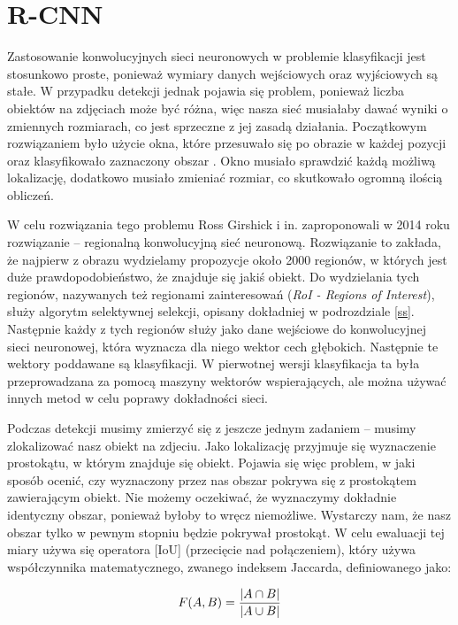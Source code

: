 \documentclass[a4paper,twoside,12pt]{book}
\newcommand{\obcy}[1]{\emph{#1}}
\newcommand{\ang}[1]{{\selectlanguage{british}\obcy{#1}}}
\begin{document}
{\section{R-CNN}
{Zastosowanie konwolucyjnych sieci neuronowych w problemie klasyfikacji jest stosunkowo proste, ponieważ wymiary danych wejściowych oraz wyjściowych są stałe. W przypadku detekcji jednak pojawia się problem, ponieważ liczba obiektów na zdjęciach może być różna, więc nasza sieć musiałaby dawać wyniki o zmiennych rozmiarach, co jest sprzeczne z jej zasadą działania. Początkowym rozwiązaniem było użycie okna, które przesuwało się po obrazie w każdej pozycji oraz klasyfikowało zaznaczony obszar \cite{szegedy2013deep}. Okno musiało sprawdzić każdą możliwą lokalizację, dodatkowo musiało zmieniać rozmiar, co skutkowało ogromną ilością obliczeń.}

{W celu rozwiązania tego problemu Ross Girshick i in. zaproponowali w 2014 roku rozwiązanie – regionalną konwolucyjną sieć neuronową\cite{girshick2014rich}. Rozwiązanie to zakłada, że najpierw z obrazu wydzielamy propozycje około 2000 regionów, w których jest duże prawdopodobieństwo, że znajduje się jakiś obiekt. Do wydzielania tych regionów, nazywanych też regionami zainteresowań (\ang {RoI - Regions of Interest}), służy algorytm selektywnej selekcji, opisany dokładniej w podrozdziale \ref{ss}. Następnie każdy z tych regionów służy jako dane wejściowe do konwolucyjnej sieci neuronowej, która wyznacza dla niego wektor cech głębokich. Następnie te wektory poddawane są klasyfikacji. W pierwotnej wersji klasyfikacja ta była przeprowadzana za pomocą maszyny wektorów wspierających, ale można używać innych metod w celu poprawy dokładności sieci.}

{Podczas detekcji musimy zmierzyć się z jeszcze jednym zadaniem – musimy zlokalizować nasz obiekt na zdjeciu. Jako lokalizację przyjmuje się wyznaczenie prostokątu, w którym znajduje się obiekt. Pojawia się więc problem, w jaki sposób ocenić, czy wyznaczony przez nas obszar pokrywa się z prostokątem zawierającym obiekt. Nie możemy oczekiwać, że wyznaczymy dokładnie identyczny obszar, ponieważ byłoby to wręcz niemożliwe. Wystarczy nam, że nasz obszar tylko w pewnym stopniu będzie pokrywał prostokąt. W celu ewaluacji tej miary używa się operatora [IoU] (przecięcie nad połączeniem), który używa współczynnika matematycznego, zwanego indeksem Jaccarda, definiowanego jako: 

\begin{equation}
F(A,B) = \frac{| A \cap B|}{ |A \cup B|}\\
\end{equation}

}}
\end{document}
